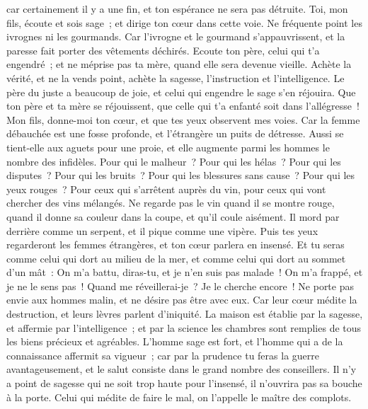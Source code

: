 \begin{multicols}{2}
car certainement il y a une fin, et ton espérance ne sera pas détruite.
Toi, mon fils, écoute et sois sage~; et dirige ton cœur dans cette voie.
Ne fréquente point les ivrognes ni les gourmands.
Car l'ivrogne et le gourmand s'appauvrissent, et la paresse fait porter des vêtements déchirés.
Ecoute ton père, celui qui t'a engendré~; et ne méprise pas ta mère, quand elle sera devenue vieille.
Achète la vérité, et ne la vends point, achète la sagesse, l'instruction et l'intelligence.
Le père du juste a beaucoup de joie, et celui qui engendre le sage s'en réjouira.
Que ton père et ta mère se réjouissent, que celle qui t'a enfanté soit dans l'allégresse~!
Mon fils, donne-moi ton cœur, et que tes yeux observent mes voies.
Car la femme débauchée est une fosse profonde, et l'étrangère un puits de détresse.
Aussi se tient-elle aux aguets pour une proie, et elle augmente parmi les hommes le nombre des infidèles.
Pour qui le malheur~? Pour qui les hélas~? Pour qui les disputes~? Pour qui les bruits~? Pour qui les blessures sans cause~? Pour qui les yeux rouges~?
Pour ceux qui s'arrêtent auprès du vin, pour ceux qui vont chercher des vins mélangés.
Ne regarde pas le vin quand il se montre rouge, quand il donne sa couleur dans la coupe, et qu'il coule aisément.
Il mord par derrière comme un serpent, et il pique comme une vipère.
Puis tes yeux regarderont les femmes étrangères, et ton cœur parlera en insensé.
Et tu seras comme celui qui dort au milieu de la mer, et comme celui qui dort au sommet d'un mât~:
On m'a battu, diras-tu, et je n'en suis pas malade~! On m'a frappé, et je ne le sens pas~! Quand me réveillerai-je~? Je le cherche encore~!
\VerseOne{}Ne porte pas envie aux hommes malin, et ne désire pas être avec eux.
Car leur cœur médite la destruction, et leurs lèvres parlent d'iniquité.
La maison est établie par la sagesse, et affermie par l'intelligence~;
et par la science les chambres sont remplies de tous les biens précieux et agréables.
L'homme sage est fort, et l'homme qui a de la connaissance affermit sa vigueur~;
car par la prudence tu feras la guerre avantageusement, et le salut consiste dans le grand nombre des conseillers.
Il n'y a point de sagesse qui ne soit trop haute pour l'insensé, il n'ouvrira pas sa bouche à la porte.
Celui qui médite de faire le mal, on l'appelle le maître des complots.

\end{multicols}
